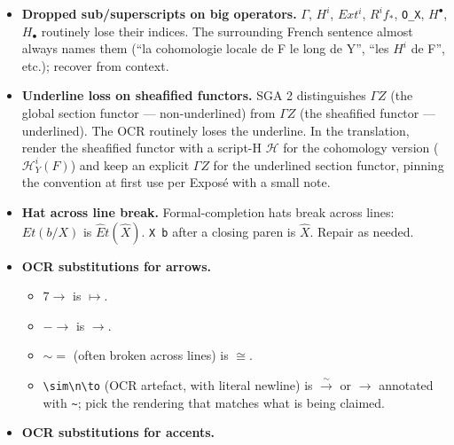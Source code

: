 \documentclass[
  11pt,
  a4paper,
]{book}
\providecommand{\tightlist}{%
  \setlength{\itemsep}{0pt}\setlength{\parskip}{0pt}}
\begin{document}
\begin{itemize}
\tightlist
\item
  \textbf{Dropped sub/superscripts on big operators.} \(\Gamma\),
  \(H^{i}\), \(Ext^{i}\), \(R^{i} f_{*}\), \texttt{O\_X},
  \(H^{\bullet}\), \(H_{\bullet}\) routinely lose their indices. The
  surrounding French sentence almost always names them (``la cohomologie
  locale de F le long de Y'', ``les \(H^{i}\) de F'', etc.); recover
  from context.
\item
  \textbf{Underline loss on sheafified functors.} SGA 2 distinguishes
  \(\Gamma Z\) (the global section functor --- non-underlined) from
  \(\Gamma Z\) (the sheafified functor --- underlined). The OCR
  routinely loses the underline. In the translation, render the
  sheafified functor with a script-H \(\mathcal{H}\) for the cohomology
  version (\(\mathcal{H}^{i}_{Y}(F)\)) and keep an explicit \(\Gamma Z\)
  for the underlined section functor, pinning the convention at first
  use per Exposé with a small note.
\item
  \textbf{Hat across line break.} Formal-completion hats break across
  lines: \(Et( b / X)\) is \(\hat{E}t(\hat{X})\). \texttt{X\ b} after a
  closing paren is \(\hat{X}\). Repair as needed.
\item
  \textbf{OCR substitutions for arrows.}

  \begin{itemize}
  \tightlist
  \item
    \(7\to\) is \(\mapsto\).
  \item
    \(-\to\) is \(\to\).
  \item
    \(\sim=\) (often broken across lines) is \(\cong\).
  \item
    \texttt{\textbackslash{}sim\textbackslash{}n\textbackslash{}to} (OCR
    artefact, with literal newline) is \(\xrightarrow{\sim}\) or \(\to\)
    annotated with \texttt{\textasciitilde{}}; pick the rendering that
    matches what is being claimed.
  \end{itemize}
\item
  \textbf{OCR substitutions for accents.}


\end{itemize}
\end{document}
